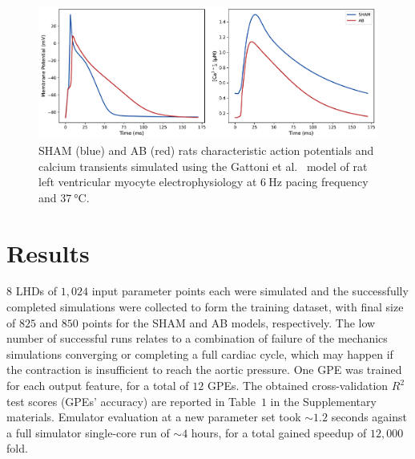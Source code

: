 \begin{figure}[!ht]
    \myfloatalign
    \includegraphics[width=\textwidth]{figures/chapter02/sham_vs_ab_ca_ap.pdf}
    \caption{SHAM (blue) and AB (red) rats characteristic action potentials and calcium transients simulated using the Gattoni et al.~\cite{Gattoni:2017} model of rat left ventricular myocyte electrophysiology at $\SI{6}{\hertz}$ pacing frequency and $\SI{37}{\celsius}$.}
    \label{fig:shamvsabcaap}
\end{figure}


%
%
%
\section{Results}\label{sec:ch4results}
$8$ LHDs of $1,024$ input parameter points each were simulated and the successfully completed simulations were collected to form the training dataset, with final size of $825$ and $850$ points for the SHAM and AB models, respectively. The low number of successful runs relates to a combination of failure of the mechanics simulations converging or completing a full cardiac cycle, which may happen if the contraction is insufficient to reach the aortic pressure. One GPE was trained for each output feature, for a total of $12$ GPEs. The obtained cross-validation $R^2$ test scores (GPEs' accuracy) are reported in Table~$1$ in the Supplementary materials. Emulator evaluation at a new parameter set took $\sim 1.2$ seconds against a full simulator single-core run of $\sim 4$ hours, for a total gained speedup of $12,000$ fold.


